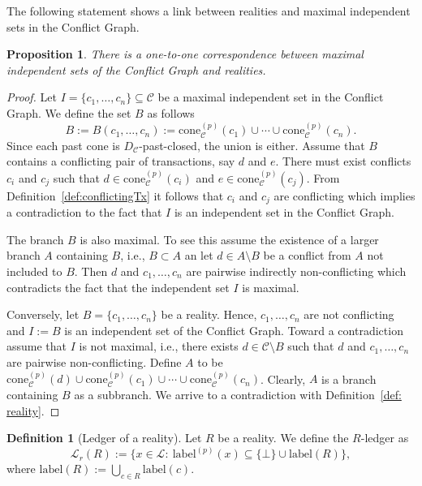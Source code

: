 \documentclass[11pt]{article}
\newcommand{\lab}{\mathrm{label}}
\newcommand{\conflictset}{\mathcal{C}}
\newcommand{\ledger}{\mathcal{L}}
\newcommand{\ConflictDAG}{D_{\conflictset}}
\newcommand{\cone}[3]{\mathrm{cone}_{#2}^{(#1)}\left(#3\right)}
\theoremstyle{plain}
\newtheorem{proposition}{Proposition}
\theoremstyle{definition}
\newtheorem{definition}{Definition}
\numberwithin{definition}{section}
\numberwithin{lemma}{section}
\numberwithin{ass}{section}
\numberwithin{remark}{section}
\numberwithin{example}{section}
\numberwithin{proposition}{section}
\numberwithin{theorem}{section}
\begin{document}
The following statement shows a link between realities and maximal independent sets in the Conflict Graph.
\begin{proposition}\label{prop:maximalIndReality}
There is a one-to-one correspondence between maximal independent sets of the Conflict Graph and realities.
\end{proposition}
\begin{proof}
 Let $I=\{c_1, \ldots, c_n \} \subseteq \conflictset$ be a maximal independent set in the Conflict Graph. We define the set  ${B}$ as follows
$$
     {B} := {B} (c_1, \ldots, c_n) :=  \cone{p}{\conflictset}{c_1} \cup \cdots \cup  \cone{p}{\conflictset}{c_n}.
$$
Since each past cone is $\ConflictDAG$-past-closed, the union is either. Assume that ${B}$ contains a conflicting pair of transactions, say $d$ and $e$. There must exist conflicts $c_i$ and $c_j$ such that $d \in \cone{p}{\conflictset}{c_i}$ and $e \in \cone{p}{\conflictset}{c_j}$. From Definition~\ref{def:conflictingTx} it follows that $c_i$  and $c_j$ are conflicting which implies a contradiction to the fact that $I$ is an independent set in the Conflict Graph.

The branch ${B}$ is also maximal. To see this assume the existence of a larger branch $A$ containing ${B}$, i.e., ${B}\subset A$ an let $d\in A\setminus{B}$ be a conflict from $A$ not included to ${B}$. Then $d$ and $c_1,\ldots,c_n$ are pairwise indirectly non-conflicting which contradicts the fact that the independent set $I$ is maximal.

Conversely, let ${B}=\{c_1,\ldots, c_n\}$ be a reality. Hence, $c_1,\ldots,c_n$ are not conflicting and $I:={B}$ is an independent set of the Conflict Graph. Toward a contradiction assume that $I$ is not maximal, i.e., there exists $d\in\conflictset \setminus {B}$ such that $d$ and $c_1,\ldots, c_n$ are pairwise non-conflicting. Define $A$ to be $  \cone{p}{\conflictset}{d} \cup \cone{p}{\conflictset}{c_1} \cup \cdots \cup  \cone{p}{\conflictset}{c_n}$. Clearly, $A$ is a branch containing ${B}$ as a subbranch. We arrive to a contradiction with Definition~\ref{def: reality}.
\end{proof}

\begin{definition}[Ledger of a reality]\label{def: R-ledger}
Let $R$ be a reality. We define the $R$-ledger as
\[
\ledger_r({R}) := \{ x\in \ledger: \ \lab^{(p)}(x) \subseteq \{\bot\} \cup \lab({R})\},
\]
where  $\lab({R}) := \bigcup\limits_{c\in {R}} \lab(c).$
\end{definition}
\end{document}
